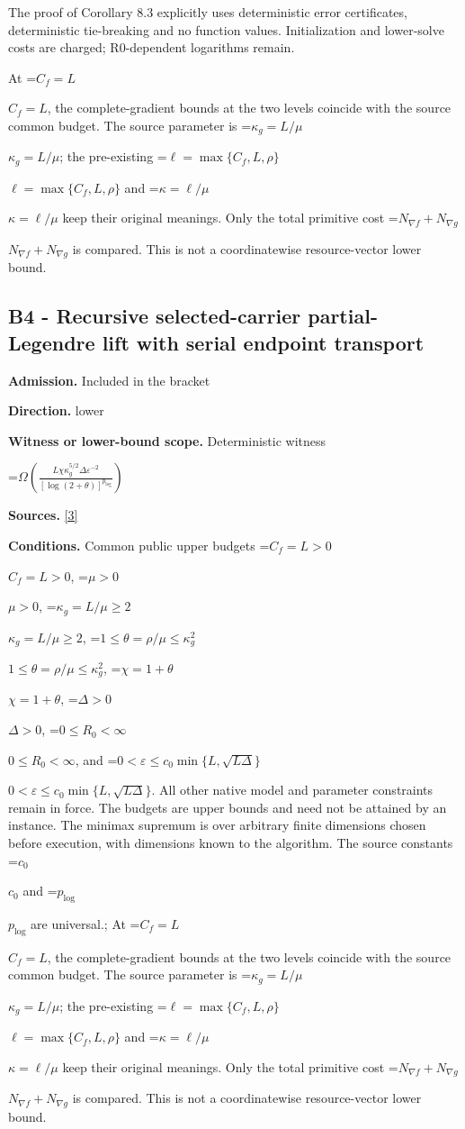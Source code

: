\documentclass[10pt,a4paper]{article}
\newcommand{\AtlasMath}[1]{\par\begingroup\centering\setbox0=\hbox{$\displaystyle #1$}\ifdim\wd0>1.4\linewidth\typeout{ATLAS WIDE FORMULA: \the\wd0}\fi\ifdim\wd0>\linewidth\resizebox{\linewidth}{!}{\box0}\else\box0\fi\par\endgroup}
\newcommand{\AtlasInlineMath}[1]{\begingroup\setbox0=\hbox{$#1$}\ifdim\wd0>.4\linewidth\endgroup\AtlasMath{#1}\else\endgroup$#1$\fi}
\begin{document}
The proof of Corollary 8.3 explicitly uses deterministic error certificates, deterministic tie-breaking and no function values. Initialization and lower-solve costs are charged; R0-dependent logarithms remain.



At \AtlasInlineMath{C_f=L}, the complete-gradient bounds at the two levels coincide with the source common budget. The source parameter is \AtlasInlineMath{\kappa_g=L/\mu}; the pre-existing \AtlasInlineMath{\ell=\max\{C_f,L,\rho\}} and \AtlasInlineMath{\kappa=\ell/\mu} keep their original meanings. Only the total primitive cost \AtlasInlineMath{N_{\nabla f}+N_{\nabla g}} is compared. This is not a coordinatewise resource-vector lower bound.



\subsection{B4 - Recursive selected-carrier partial-Legendre lift with serial endpoint transport}


\textbf{Admission.} Included in the bracket



\textbf{Direction.} lower



\textbf{Witness or lower-bound scope.} Deterministic witness



\AtlasMath{\Omega\!\left(\frac{L\chi\kappa_g^{5/2}\Delta\varepsilon^{-2}}{[\log(2+\theta)]^{p_{\log}}}\right)}


\textbf{Sources.} \href{https://github.com/WU-Wendao/Colombo/blob/main/colombo_sensorium/Complexity_altas/data/sources/colombo/SFO_JOINT_20261126/manuscript.pdf}{[3]}



\textbf{Conditions.} Common public upper budgets \AtlasInlineMath{C_f=L>0}, \AtlasInlineMath{\mu>0}, \AtlasInlineMath{\kappa_g=L/\mu\ge2}, \AtlasInlineMath{1\le\theta=\rho/\mu\le\kappa_g^2}, \AtlasInlineMath{\chi=1+\theta}, \AtlasInlineMath{\Delta>0}, \AtlasInlineMath{0\le R_0<\infty}, and \AtlasInlineMath{0<\varepsilon\le c_0\min\{L,\sqrt{L\Delta}\}}. All other native model and parameter constraints remain in force. The budgets are upper bounds and need not be attained by an instance. The minimax supremum is over arbitrary finite dimensions chosen before execution, with dimensions known to the algorithm. The source constants \AtlasInlineMath{c_0} and \AtlasInlineMath{p_{\log}} are universal.; At \AtlasInlineMath{C_f=L}, the complete-gradient bounds at the two levels coincide with the source common budget. The source parameter is \AtlasInlineMath{\kappa_g=L/\mu}; the pre-existing \AtlasInlineMath{\ell=\max\{C_f,L,\rho\}} and \AtlasInlineMath{\kappa=\ell/\mu} keep their original meanings. Only the total primitive cost \AtlasInlineMath{N_{\nabla f}+N_{\nabla g}} is compared. This is not a coordinatewise resource-vector lower bound.
\end{document}
